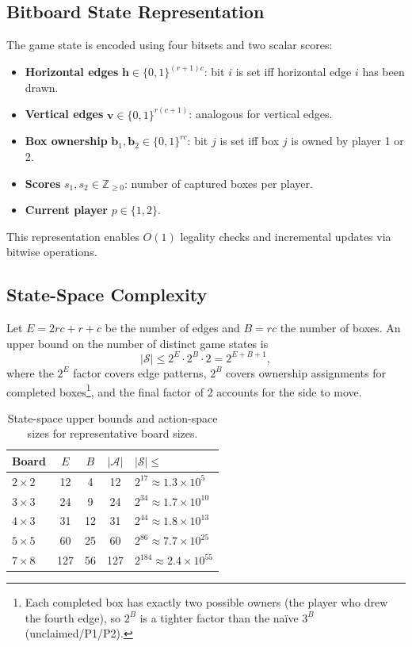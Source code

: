 \documentclass[11pt]{article}
\begin{document}
\subsection{Bitboard State Representation}
\label{sec:bitboard}
The game state is encoded using four bitsets and two scalar scores:
\begin{itemize}
  \item \textbf{Horizontal edges} $\mathbf{h} \in \{0,1\}^{(r+1)c}$:
    bit $i$ is set iff horizontal edge $i$ has been drawn.
  \item \textbf{Vertical edges} $\mathbf{v} \in \{0,1\}^{r(c+1)}$:
    analogous for vertical edges.
  \item \textbf{Box ownership} $\mathbf{b}_1, \mathbf{b}_2 \in \{0,1\}^{rc}$:
    bit $j$ is set iff box $j$ is owned by player 1 or 2.
  \item \textbf{Scores} $s_1, s_2 \in \mathbb{Z}_{\ge 0}$: number of
    captured boxes per player.
  \item \textbf{Current player} $p \in \{1, 2\}$.
\end{itemize}
This representation enables $O(1)$ legality checks and incremental
updates via bitwise operations.

\subsection{State-Space Complexity}
\label{sec:statespace}
Let $E = 2rc+r+c$ be the number of edges and $B=rc$ the number of boxes.
An upper bound on the number of distinct game states is
\begin{equation}
  |\mathcal{S}| \le 2^E \cdot 2^B \cdot 2 = 2^{E+B+1},
\end{equation}
where the $2^E$ factor covers edge patterns, $2^B$ covers ownership
assignments for completed boxes\footnote{Each completed box has exactly
two possible owners (the player who drew the fourth edge), so $2^B$ is a
tighter factor than the na\"ive $3^B$ (unclaimed/P1/P2).}, and the final
factor of 2 accounts for the side to move.

\begin{table}[t]
  \centering
  \caption{State-space upper bounds and action-space sizes for representative board sizes.}
  \label{tab:statespace}
  \begin{tabular}{lcccl}
    \toprule
    Board & $E$ & $B$ & $|\mathcal{A}|$ & $|\mathcal{S}|\le$ \\
    \midrule
    $2{\times}2$ & 12 & 4 & 12 & $2^{17} \approx 1.3 \times 10^5$ \\
    $3{\times}3$ & 24 & 9 & 24 & $2^{34} \approx 1.7 \times 10^{10}$ \\
    $4{\times}3$ & 31 & 12 & 31 & $2^{44} \approx 1.8 \times 10^{13}$ \\
    $5{\times}5$ & 60 & 25 & 60 & $2^{86} \approx 7.7 \times 10^{25}$ \\
    $7{\times}8$ & 127 & 56 & 127 & $2^{184} \approx 2.4 \times 10^{55}$ \\
    \bottomrule
  \end{tabular}
\end{table}
\end{document}

